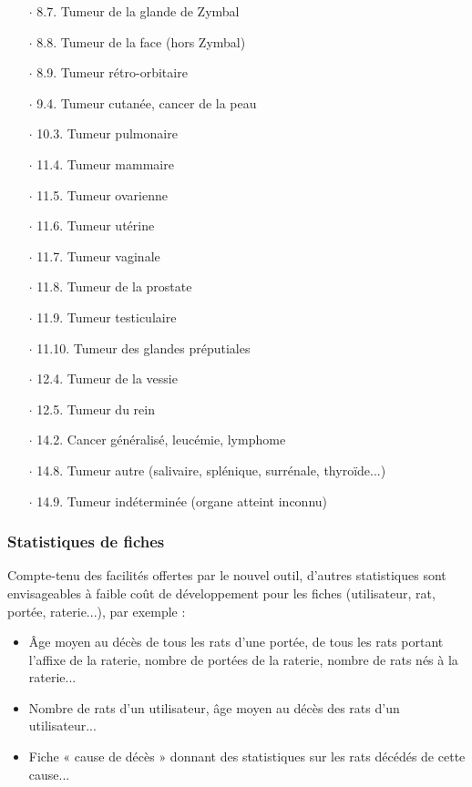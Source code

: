 \documentclass[a4paper,10pt]{article}
\begin{document}
\begin{enumerate}
\begin{itemize}
\begin{itemize}
\item[$\cdot$ 8.7.]Tumeur de la glande de Zymbal
\item[$\cdot$ 8.8.]Tumeur de la face (hors Zymbal)
\item[$\cdot$ 8.9.]Tumeur rétro-orbitaire
\item[$\cdot$ 9.4.]Tumeur cutanée, cancer de la peau
\item[$\cdot$ 10.3.]Tumeur pulmonaire
\item[$\cdot$ 11.4.]Tumeur mammaire
\item[$\cdot$ 11.5.]Tumeur ovarienne
\item[$\cdot$ 11.6.]Tumeur utérine
\item[$\cdot$ 11.7.]Tumeur vaginale
\item[$\cdot$ 11.8.]Tumeur de la prostate
\item[$\cdot$ 11.9.]Tumeur testiculaire
\item[$\cdot$ 11.10.]Tumeur des glandes préputiales
\item[$\cdot$ 12.4.]Tumeur de la vessie
\item[$\cdot$ 12.5.]Tumeur du rein
\item[$\cdot$ 14.2.]Cancer généralisé, leucémie, lymphome
\item[$\cdot$ 14.8.]Tumeur autre (salivaire, splénique, surrénale, thyroïde...) 
\item[$\cdot$ 14.9.]Tumeur indéterminée (organe atteint inconnu)
\end{itemize}
\end{itemize}
\end{enumerate}

\subsubsection{Statistiques de fiches}

Compte-tenu des facilités offertes par le nouvel outil, d'autres statistiques sont envisageables à faible coût de développement pour les fiches (utilisateur, rat, portée, raterie...), par exemple :
\begin{itemize}
\item Âge moyen au décès de tous les rats d'une portée, de tous les rats portant l'affixe de la raterie, nombre de portées de la raterie, nombre de rats nés à la raterie...
\item Nombre de rats d'un utilisateur, âge moyen au décès des rats d'un utilisateur...
\item Fiche « cause de décès » donnant des statistiques sur les rats décédés de cette cause...  
\end{itemize}
\end{document}
